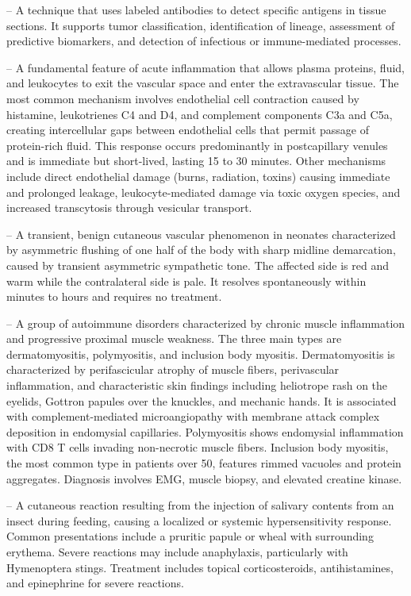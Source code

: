 -- A technique that uses labeled antibodies to detect specific antigens in tissue sections. It supports tumor classification, identification of lineage, assessment of predictive biomarkers, and detection of infectious or immune-mediated processes.

-- A fundamental feature of acute inflammation that allows plasma proteins, fluid, and leukocytes to exit the vascular space and enter the extravascular tissue. The most common mechanism involves endothelial cell contraction caused by histamine, leukotrienes C4 and D4, and complement components C3a and C5a, creating intercellular gaps between endothelial cells that permit passage of protein-rich fluid. This response occurs predominantly in postcapillary venules and is immediate but short-lived, lasting 15 to 30 minutes. Other mechanisms include direct endothelial damage (burns, radiation, toxins) causing immediate and prolonged leakage, leukocyte-mediated damage via toxic oxygen species, and increased transcytosis through vesicular transport.

-- A transient, benign cutaneous vascular phenomenon in neonates characterized by asymmetric flushing of one half of the body with sharp midline demarcation, caused by transient asymmetric sympathetic tone. The affected side is red and warm while the contralateral side is pale. It resolves spontaneously within minutes to hours and requires no treatment.

-- A group of autoimmune disorders characterized by chronic muscle inflammation and progressive proximal muscle weakness. The three main types are dermatomyositis, polymyositis, and inclusion body myositis. Dermatomyositis is characterized by perifascicular atrophy of muscle fibers, perivascular inflammation, and characteristic skin findings including heliotrope rash on the eyelids, Gottron papules over the knuckles, and mechanic hands. It is associated with complement-mediated microangiopathy with membrane attack complex deposition in endomysial capillaries. Polymyositis shows endomysial inflammation with CD8 T cells invading non-necrotic muscle fibers. Inclusion body myositis, the most common type in patients over 50, features rimmed vacuoles and protein aggregates. Diagnosis involves EMG, muscle biopsy, and elevated creatine kinase.

-- A cutaneous reaction resulting from the injection of salivary contents from an insect during feeding, causing a localized or systemic hypersensitivity response. Common presentations include a pruritic papule or wheal with surrounding erythema. Severe reactions may include anaphylaxis, particularly with Hymenoptera stings. Treatment includes topical corticosteroids, antihistamines, and epinephrine for severe reactions.

